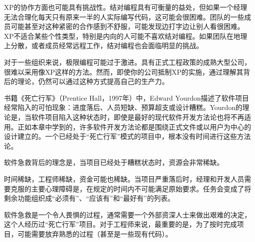 XP的协作方面也可能具有挑战性。结对编程具有可衡量的益处，但如果一个经理无法合理化每天只有原来一半的人实际编写代码，这可能会很困难。团队的一些成员可能甚至对这种紧密的合作感到不舒服，可能发现边打字边让别人看很困难。XP不适合某些个性类型，特别是内向的人可能不喜欢结对编程。如果团队在地理上分散，或者成员经常远程工作，结对编程也会面临明显的挑战。

对于一些组织来说，极限编程可能过于激进。具有正式工程政策的成熟大型公司，很难以采用像XP这样的方法。然而，即使你的公司抵制XP的实施，通过理解其背后的理论，仍然可以通过这种方式提高自己的生产力。


书籍《死亡行军》（Prentice Hall，1997年）中，Edward Yourdon描述了软件项目经常陷入的可怕现象：进度落后、人员短缺、预算超支或设计糟糕。Yourdon的理论是，当软件项目陷入这种状态时，即使是最好的现代软件开发方法论也将不再适用。正如本章中学到的，许多软件开发方法论都是围绕正式文件或以用户为中心的设计建立的。一个已经处于“死亡行军”模式的项目中，根本没有时间进行这些方法论。

软件急救背后的理念是，当项目已经处于糟糕状态时，资源会非常稀缺。

时间稀缺，工程师稀缺，资金可能也稀缺。当项目严重落后时，经理和开发人员需要克服的主要心理障碍是，在规定的时间内不可能满足原始要求。任务会变成了将剩余功能组织成“必须有”、“应该有”和“最好有”的列表。

软件急救是一个令人畏惧的过程，通常需要一个外部资深人士来做出艰难的决定，这个人经历过“死亡行军”项目。对于工程师来说，最重要的是，为了按时完成项目，可能需要放弃熟悉的过程（甚至是一些现有代码）。


